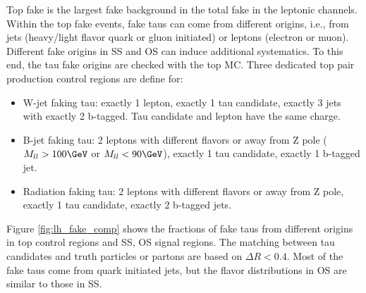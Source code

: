 Top fake is the largest fake background in the total fake in the leptonic channels. 
Within the top fake events, fake taus can come from different origins, i.e., from jets (heavy/light flavor quark or gluon initiated) 
or leptons (electron or muon). Different fake origins in SS and OS can induce additional systematics. To this end, the tau fake 
origins are checked with the top MC. Three dedicated top pair production control regions are define for:
\begin{itemize}
\item{W-jet faking tau: exactly 1 lepton, exactly 1 tau candidate, exactly 3 jets with exactly 2 b-tagged. Tau candidate and lepton have the same charge.}
\item{B-jet faking tau: 2 leptons with different flavors or away from Z pole ($M_{ll}>100\GeV$ or $M_{ll}<90\GeV$), exactly 1 tau candidate, exactly 1 b-tagged jet.}
\item{Radiation faking tau: 2 leptons with different flavors or away from Z pole, exactly 1 tau candidate, exactly 2 b-tagged jets.}
\end{itemize}
Figure \ref{fig:lh_fake_comp} shows the fractions of fake taus from different 
origins in top control regions and SS, OS signal regions. The matching between tau candidates and truth particles or partons are based on $\Delta R<0.4$. 
Most of the fake taus come from quark initiated jets, but the flavor distributions in OS are similar to those in SS. 

